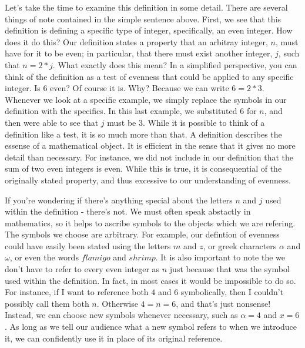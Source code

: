 \documentclass[a4paper,12pt]{article}
\begin{document}
Let's take the time to examine this definition in some detail. There are several things of note contained in the simple sentence above. First, we see that this definition is defining a specific type of integer, specifically, an even integer. How does it do this? Our definition states a property that an arbitray integer, $n$, must have for it to be even; in particular, that there must exist another integer, $j$, such that $n = 2*j$. What exactly does this mean? In a simplified perspective, you can think of the definition as a test of evenness that could be applied to any specific integer. Is $6$ even? Of course it is. Why? Because we can write $6 = 2*3$. Whenever we look at a specific example, we simply replace the symbols in our definition with the specifics. In this last example, we substituted $6$ for $n$, and then were able to see that $j$ must be $3$. While it is possible to think of a definition like a test, it is so much more than that. A definition describes the essense of a mathematical object. It is efficient in the sense that it gives no more detail than necessary. For instance, we did not include in our definition that the sum of two even integers is even. While this is true, it is consequential of the originally stated property, and thus excessive to our understanding of evenness.

If you're wondering if there's anything special about the letters $n$ and $j$ used within the definition - there's not. We must often speak abstactly in mathematics, so it helps to ascribe symbols to the objects which we are refering. The symbols we choose are arbitrary. For example, our defintion of evenness could have easily been stated using the letters $m$ and $z$, or greek characters $\alpha$ and $\omega$, or even the words $flamigo$ and $shrimp$. It is also important to note the we don't have to refer to every even integer as $n$ just because that was the symbol used within the definition. In fact, in most cases it would be impossible to do so. For instance, if I want to reference both $4$ and $6$ symbolically, then I couldn't possibly call them both $n$. Otherwise $4 = n = 6$, and that's just nonsense! Instead, we can choose new symbols whenever necessary, such as $\alpha = 4$ and $x = 6$. As long as we tell our audience what a new symbol refers to when we introduce it, we can confidently use it in place of its original reference.  
\end{document}
